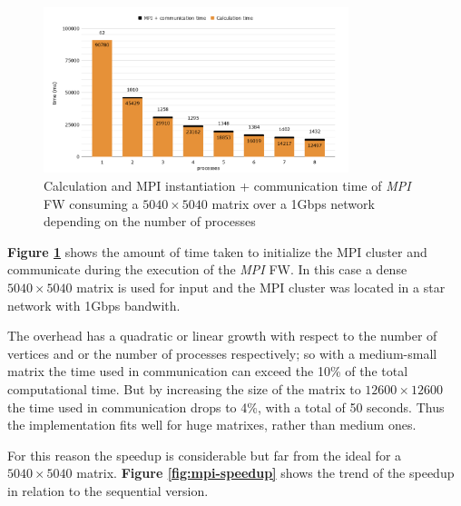 \begin{figure}[h!]
\centering                                                                        
\includegraphics[width=3.5in]{diagrams/mpi-time}
\captionsetup{justification=centering}                                                                                                                                   
\caption{Calculation and MPI instantiation + communication time of \emph{MPI} FW consuming a $5040\times5040$ matrix over a 1Gbps network depending on the number of processes}
\label{fig:mpi-time}                                                                                                                                                           
\end{figure}

\textbf{Figure \ref*{fig:mpi-time}} shows the amount of time taken to initialize the MPI cluster and communicate during the execution of the \emph{MPI} FW. In this case a dense 
$5040\times5040$ matrix is used for input and the MPI cluster was located in a star network with 1Gbps bandwith.

The overhead has a quadratic or linear growth with respect to the number of vertices and or the number of processes respectively; 
so with a medium-small matrix the time used in communication can exceed the 10\% of the total computational time. 
But by increasing the size of the matrix to $12600\times12600$ the time used in communication drops to 4\%, with a total of 50 seconds. Thus the implementation fits well for huge matrixes, rather 
than medium ones.

For this reason the speedup is considerable but far from the ideal for a $5040\times5040$ matrix. \textbf{Figure \ref*{fig:mpi-speedup}} shows the trend of the speedup in relation to the 
sequential version.

